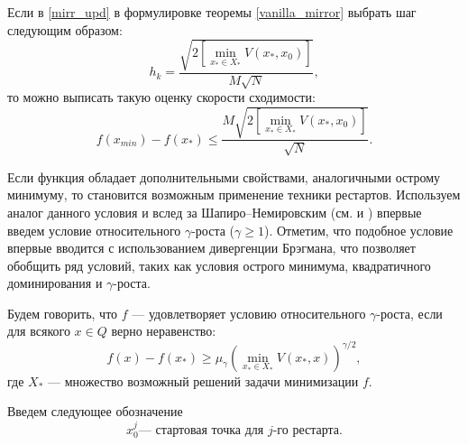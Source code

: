     \begin{remark}
        Если в \eqref{mirr_upd} в формулировке теоремы \ref{vanilla_mirror} выбрать шаг следующим образом:
        \begin{equation} \label{mirr_step}
            h_{k} = \frac{\sqrt{2 \left[\min\limits_{x_* \in X_*}{V(x_*, x_0)}\right] }}{M\sqrt{N}},
        \end{equation}
        то можно выписать такую оценку скорости сходимости:
        \begin{equation} \label{mirr_est}
            f(x_{min}) - f(x_*) \leq \frac{M\sqrt{2 \left[\min\limits_{x_* \in X_*}{V(x_*, x_0)}\right]}}{\sqrt{N}}.
        \end{equation}
    \end{remark}
    Если функция обладает дополнительными свойствами, аналогичными острому минимуму,  то становится возможным применение техники рестартов. Используем аналог данного условия и вслед за Шапиро–Немировским (см. \cite{shapiro_2005} и \cite{shapiro_2021} ) впервые введем условие относительного $\gamma$-роста ($\gamma \geq 1$). Отметим, что подобное условие впервые вводится с использованием дивергенции Брэгмана, что позволяет обобщить ряд условий, таких как условия острого минимума, квадратичного доминирования и $\gamma$-роста.
    \begin{definition}
       Будем говорить, что $f$ --- удовлетворяет условию относительного $\gamma$-роста, если для всякого $x \in Q$ верно неравенство:
       \begin{equation} \label{gamma-growth}
           f(x) - f(x_*) \geq \mu_{\gamma}\left(\min_{x_* \in X_*}{V(x_*,x)}\right)^{\gamma/2},
       \end{equation}
       где $X_*$ --- множество возможный решений задачи минимизации $f$. 
    \end{definition}
    Введем следующее обозначение
    \[
        x_0^j \text{--- стартовая точка для } j\text{-го рестарта}.
    \]
    
